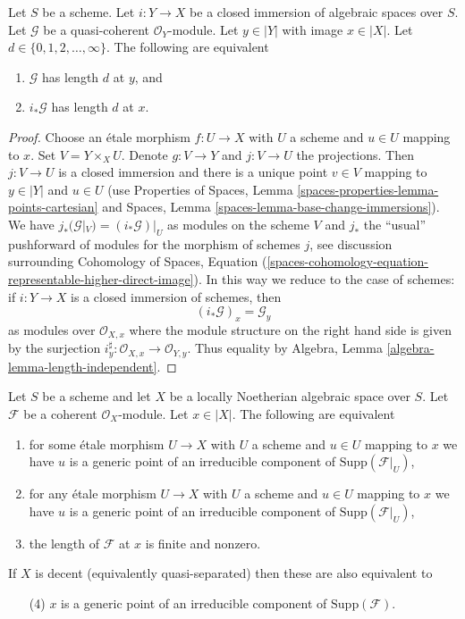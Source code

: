 \begin{lemma}
\label{lemma-length-closed-immersion}
Let $S$ be a scheme. Let $i : Y \to X$ be a closed immersion of
algebraic spaces over $S$. Let $\mathcal{G}$ be a quasi-coherent
$\mathcal{O}_Y$-module. Let $y \in |Y|$ with image $x \in |X|$.
Let $d \in \{0, 1, 2, \ldots, \infty\}$. The following are
equivalent
\begin{enumerate}
\item $\mathcal{G}$ has length $d$ at $y$, and
\item $i_*\mathcal{G}$ has length $d$ at $x$.
\end{enumerate}
\end{lemma}

\begin{proof}
Choose an \'etale morphism $f : U \to X$ with $U$ a scheme
and $u \in U$ mapping to $x$. Set $V = Y \times_X U$.
Denote $g : V \to Y$ and $j : V \to U$ the projections.
Then $j : V \to U$ is a closed immersion and there is a unique
point $v \in V$ mapping to $y \in |Y|$ and $u \in U$
(use Properties of Spaces, Lemma \ref{spaces-properties-lemma-points-cartesian}
and Spaces, Lemma \ref{spaces-lemma-base-change-immersions}).
We have $j_*(\mathcal{G}|_V) = (i_*\mathcal{G})|_U$ as modules
on the scheme $V$ and $j_*$ the ``usual'' pushforward of modules
for the morphism of schemes $j$, see discussion surrounding
Cohomology of Spaces, Equation
(\ref{spaces-cohomology-equation-representable-higher-direct-image}).
In this way we reduce to the case of schemes: if $i : Y \to X$
is a closed immersion of schemes, then
$$
(i_*\mathcal{G})_x = \mathcal{G}_y
$$
as modules over $\mathcal{O}_{X, x}$ where the module structure
on the right hand side is given by the surjection
$i_y^\sharp : \mathcal{O}_{X, x} \to \mathcal{O}_{Y, y}$.
Thus equality by
Algebra, Lemma \ref{algebra-lemma-length-independent}.
\end{proof}

\begin{lemma}
\label{lemma-length-finite}
Let $S$ be a scheme and let $X$ be a
locally Noetherian algebraic space over $S$.
Let $\mathcal{F}$ be a coherent $\mathcal{O}_X$-module.
Let $x \in |X|$. The following are equivalent
\begin{enumerate}
\item for some \'etale morphism $U \to X$ with $U$ a scheme
and $u \in U$ mapping to $x$ we have $u$ is a generic point
of an irreducible component of $\text{Supp}(\mathcal{F}|_U)$,
\item for any \'etale morphism $U \to X$ with $U$ a scheme
and $u \in U$ mapping to $x$ we have $u$ is a generic point
of an irreducible component of $\text{Supp}(\mathcal{F}|_U)$,
\item the length of $\mathcal{F}$ at $x$ is finite and nonzero.
\end{enumerate}
If $X$ is decent (equivalently quasi-separated) then these are
also equivalent to
\begin{enumerate}
\item[(4)] $x$ is a generic point of an irreducible component of
$\text{Supp}(\mathcal{F})$.
\end{enumerate}
\end{lemma}

